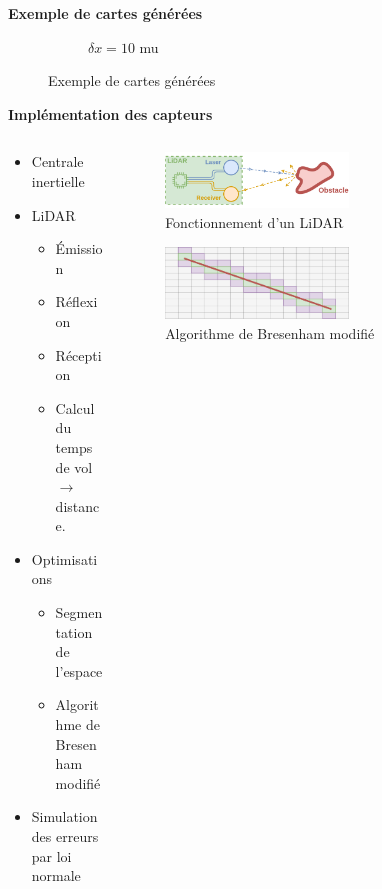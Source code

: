 \documentclass[aspectratio=169,10pt]{beamer}
\begin{document}
\begin{frame}{\textbf{Exemple de cartes générées}}
\begin{figure}[H]
\begin{subfigure}{0.32\textwidth}
			\caption{$\delta x = 10$ mu}
			\label{fig:real_map_10}
		\end{subfigure}
		\caption{Exemple de cartes générées}
		\label{fig:three_map_example}
	\end{figure}
\end{frame}

\begin{frame}{\textbf{Implémentation des capteurs}}
	\begin{columns}
		\begin{column}{0.5\textwidth}
			\begin{itemize}
				\item Centrale inertielle
				\vspace{0.2cm}
				\item LiDAR
				\begin{itemize}
					\item Émission
					\item Réflexion
					\item Réception
					\item Calcul du temps de vol $\rightarrow$ distance.
				\end{itemize}
				\vspace{0.2cm}
				\item Optimisations
				\begin{itemize}
					\item Segmentation de l'espace
					\item Algorithme de Bresenham modifié
				\end{itemize}
				\item Simulation des erreurs par loi normale
			\end{itemize}
		\end{column}
		\begin{column}{0.5\textwidth}
			\begin{figure}
				\centering
				\includegraphics[width=0.6\textwidth]{IMAGES/lidar_operation_scheme.png}
				\caption{Fonctionnement d'un LiDAR}
				\label{fig:lidar_ope}
			\end{figure}
			\begin{figure}
				\centering
				\includegraphics[width=0.6\textwidth]{IMAGES/draw_line.png}
				\caption{Algorithme de Bresenham modifié}
				\label{fig:bresenham_algorithm}
			\end{figure}
			

\end{column}
\end{columns}
\end{frame}
\end{document}
